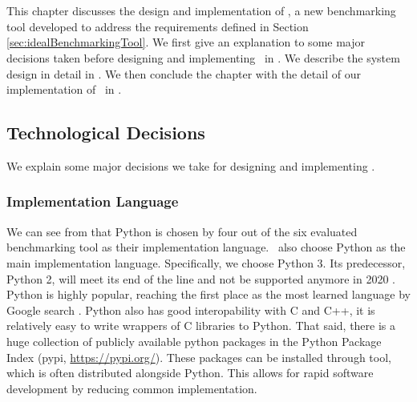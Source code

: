 \chapter{\chImplementation}
\label{ch:implementation}


This chapter discusses the design and implementation of \OurBenchmarkingTool, a new benchmarking tool developed to address the requirements defined in Section \ref{sec:idealBenchmarkingTool}.
We first give an explanation to some major decisions taken before designing and implementing \OurBenchmarkingTool~in .
We describe the system design in detail in .
We then conclude the chapter with the detail of our implementation of \OurBenchmarkingTool~in .


\section{Technological Decisions}
\label{sec:impl.decisions}

We explain some major decisions we take for designing and implementing \OurBenchmarkingTool.

\subsection{Implementation Language}

We can see from  that Python is chosen by four out of the six evaluated benchmarking tool as their implementation language.
\First~also choose Python as the main implementation language.
Specifically, we choose Python 3.
Its predecessor, Python 2, will meet its end of the line and not be supported anymore in 2020 \citep{petersonPEP373Python2008}.
Python is highly popular, reaching the first place as the most learned language by Google search \citep{carbonnellePYPLPopularitYProgramming2019}.
Python also has good interopability with C and C++, it is relatively easy to write wrappers of C libraries to Python.
That said, there is a huge collection of publicly available python packages in the Python Package Index (pypi, \url{https://pypi.org/}).
These packages can be installed through  tool, which is often distributed alongside Python.
This allows for rapid software development by reducing common implementation.


